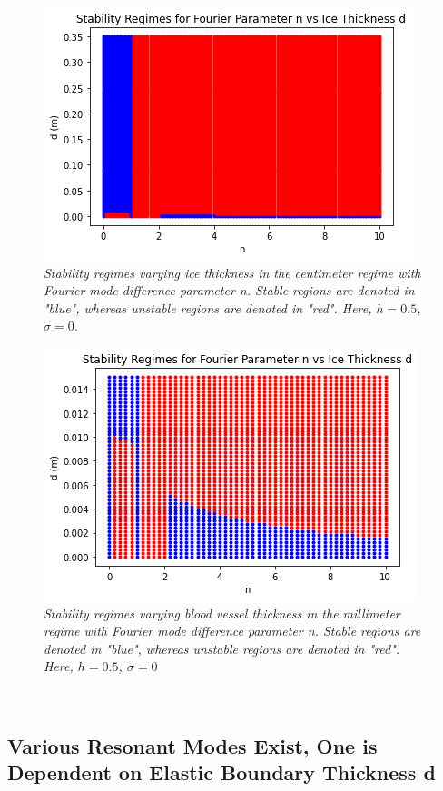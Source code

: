 \documentclass{article}
\begin{document}
\begin{figure}[hbt!]
\centering
\includegraphics[scale = .8]{Stability CM .png}
\caption{ \emph{Stability regimes varying ice thickness in the centimeter regime with Fourier mode difference parameter n. Stable regions are denoted in "blue", whereas unstable regions are denoted in "red". Here, \(h = 0.5\), \(\sigma = 0\). }} \label{CM}
\end{figure}


\begin{figure}[hbt!]
\centering
\includegraphics[scale = .8]{Stability MM.png}
\caption{\emph{Stability regimes varying blood vessel thickness in the millimeter regime with Fourier mode difference parameter n. Stable regions are denoted in "blue", whereas unstable regions are denoted in "red". Here, \(h = 0.5\), \(\sigma = 0\)}} \label{MM}
\end{figure}

\\

\clearpage

\subsection{Various Resonant Modes Exist, One is Dependent on Elastic Boundary Thickness d}
\end{document}
